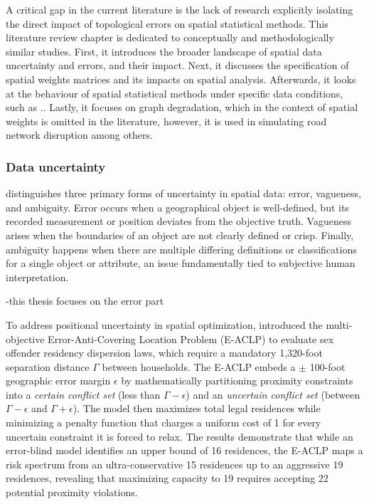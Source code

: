 \documentclass[
  english,
  12pt,
  a4paper,
]{article}
\begin{document}
A critical gap in the current literature is the lack of research
explicitly isolating the direct impact of topological errors on spatial
statistical methods. This literature review chapter is dedicated to
conceptually and methodologically similar studies. First, it introduces
the broader landscape of spatial data uncertainty and errors, and their
impact. Next, it discusses the specification of spatial weights matrices
and its impacts on spatial analysis. Afterwards, it looks at the
behaviour of spatial statistical methods under specific data conditions,
such as .. Lastly, it focuses on graph degradation, which in the context
of spatial weights is omitted in the literature, however, it is used in
simulating road network disruption among others.

\subsubsection{Data uncertainty}\label{data-uncertainty}

\citet{fisher1999models} distinguishes three primary forms of
uncertainty in spatial data: error, vagueness, and ambiguity. Error
occurs when a geographical object is well-defined, but its recorded
measurement or position deviates from the objective truth. Vagueness
arises when the boundaries of an object are not clearly defined or
crisp. Finally, ambiguity happens when there are multiple differing
definitions or classifications for a single object or attribute, an
issue fundamentally tied to subjective human interpretation.

-this thesis focuses on the error part

To address positional uncertainty in spatial optimization,
\citet{wei2012} introduced the multi-objective Error-Anti-Covering
Location Problem (E-ACLP) to evaluate sex offender residency dispersion
laws, which require a mandatory 1,320-foot separation distance
\(\Gamma\) between households. The E-ACLP embeds a \(\pm\) 100-foot
geographic error margin \(\epsilon\) by mathematically partitioning
proximity constraints into a \emph{certain conflict set} (less than
\(\Gamma - \epsilon\)) and an \emph{uncertain conflict set} (between
\(\Gamma - \epsilon\) and \(\Gamma + \epsilon\)). The model then
maximizes total legal residences while minimizing a penalty function
that charges a uniform cost of 1 for every uncertain constraint it is
forced to relax. The results demonstrate that while an error-blind model
identifies an upper bound of 16 residences, the E-ACLP maps a risk
spectrum from an ultra-conservative 15 residences up to an aggressive 19
residences, revealing that maximizing capacity to 19 requires accepting
22 potential proximity violations.
\end{document}

